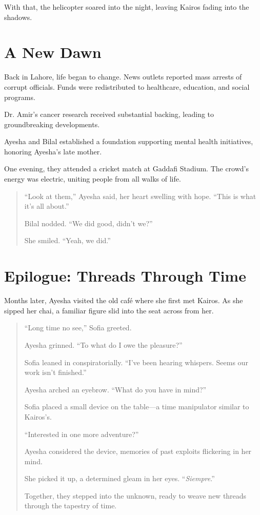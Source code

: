\documentclass[12pt]{book}
\begin{document}
With that, the helicopter soared into the night, leaving Kairos fading into the shadows.

\chapter{A New Dawn}

Back in Lahore, life began to change. News outlets reported mass arrests of corrupt officials. Funds were redistributed to healthcare, education, and social programs.

Dr. Amir's cancer research received substantial backing, leading to groundbreaking developments.

Ayesha and Bilal established a foundation supporting mental health initiatives, honoring Ayesha's late mother.

One evening, they attended a cricket match at Gaddafi Stadium. The crowd's energy was electric, uniting people from all walks of life.

\begin{quote}
    ``Look at them,'' Ayesha said, her heart swelling with hope. ``This is what it's all about.''

    Bilal nodded. ``We did good, didn't we?''

    She smiled. ``Yeah, we did.''
\end{quote}

\chapter*{Epilogue: Threads Through Time}

Months later, Ayesha visited the old café where she first met Kairos. As she sipped her chai, a familiar figure slid into the seat across from her.

\begin{quote}
    ``Long time no see,'' Sofia greeted.

    Ayesha grinned. ``To what do I owe the pleasure?''

    Sofia leaned in conspiratorially. ``I've been hearing whispers. Seems our work isn't finished.''

    Ayesha arched an eyebrow. ``What do you have in mind?''

    Sofia placed a small device on the table---a time manipulator similar to Kairos's.

    ``Interested in one more adventure?''

    Ayesha considered the device, memories of past exploits flickering in her mind.

    She picked it up, a determined gleam in her eyes. ``\textit{Siempre}.''

    Together, they stepped into the unknown, ready to weave new threads through the tapestry of time.
\end{quote}

\backmatter

\end{document}
